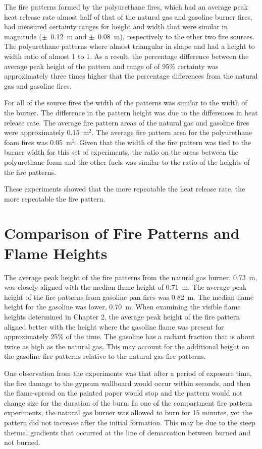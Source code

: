 \documentclass[twoside]{uocthesis}
\begin{document}
{The fire patterns formed by the polyurethane fires, which had an average peak heat release rate almost half of that of the natural gas and gasoline burner fires, had measured certainty ranges for height and width that were similar in magnitude ($\pm$~0.12~m and $\pm$~0.08~m), respectively to the other two fire sources.  The polyurethane patterns where almost triangular in shape and had a height to width ratio of almost 1 to 1.  As a result, the percentage difference between the average peak height of the pattern and range of of 95\% certainty was approximately three times higher that the percentage differences from the natural gas and gasoline fires. 

For all of the source fires the width of the patterns was similar to the width of the burner. The difference in the pattern height was due to the differences in heat release rate.  The average fire pattern areas of the natural gas and gasoline fires were approximately 0.15~m$^2$.  The average fire pattern area for the polyurethane foam fires was  0.05~m$^2$.  Given that the width of the fire pattern was tied to the burner width for this set of experiments, the ratio on the areas between the polyurethane foam and the other fuels was similar to the ratio of the heights of the fire patterns.  

These experiments showed that the more repeatable the heat release rate, the more repeatable the fire pattern.

\section{Comparison of Fire Patterns and Flame Heights}

The average peak height of the fire patterns from the natural gas burner, 0.73~m, was closely aligned with the median flame height of 0.71~m.  The average peak height of the fire patterns from gasoline pan fires was 0.82~m.  The median flame height for the gasoline was lower, 0.70~m. When examining the visible flame heights determined in Chapter 2, the average peak height of the fire pattern aligned better with the height where the gasoline flame was present for approximately 25\% of the time.  The gasoline has a radiant fraction that is about twice as high as the natural gas.  This may account for the additional height on the gasoline fire patterns relative to the natural gas fire patterns.  

One observation from the experiments was that after a period of exposure time, the fire damage to the gypsum wallboard would occur within seconds, and then the flame-spread on the painted paper would stop and the pattern would not change size for the duration of the burn.  In one of the compartment fire pattern experiments, the natural gas burner was allowed to burn for 15 minutes, yet the pattern did not increase after the initial formation.  This may be due to the steep thermal gradients that occurred at the line of demarcation between burned and not burned.    

}
\end{document}
